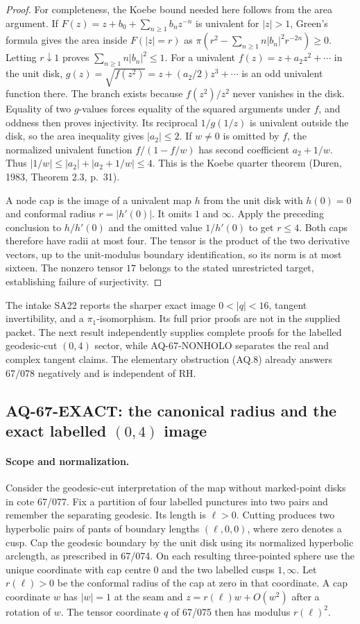 \begin{proof}
For completeness, the Koebe bound needed here follows
from the area argument. If
$F(z)=z+b_0+\sum_{n\geq1}b_nz^{-n}$ is univalent for
$|z|>1$, Green's formula gives the area inside
$F(|z|=r)$ as
$\pi(r^2-\sum_{n\geq1}n|b_n|^2r^{-2n})\geq0$.
Letting $r\downarrow1$ proves
$\sum_{n\geq1}n|b_n|^2\leq1$.
For a univalent $f(z)=z+a_2z^2+\cdots$ in the unit disk,
$g(z)=\sqrt{f(z^2)}=z+(a_2/2)z^3+\cdots$ is an odd
univalent function there. The branch exists because
$f(z^2)/z^2$ never vanishes in the disk. Equality of
two $g$-values forces equality of the squared
arguments under $f$, and oddness then proves
injectivity. Its reciprocal
$1/g(1/z)$ is univalent outside the disk, so the area
inequality gives $|a_2|\leq2$.
If $w\ne0$ is omitted by $f$, the normalized univalent
function $f/(1-f/w)$ has second coefficient $a_2+1/w$.
Thus $|1/w|\leq|a_2|+|a_2+1/w|\leq4$.
This is the Koebe quarter theorem (Duren, 1983,
Theorem 2.3, p.~31).

A node cap is the image of a univalent map $h$ from
the unit disk with $h(0)=0$ and conformal radius
$r=|h'(0)|$. It omits $1$ and $\infty$.
Apply the preceding conclusion to $h/h'(0)$ and
the omitted value $1/h'(0)$ to get $r\leq4$.
Both caps therefore have radii at most four.
The tensor is the product of the two derivative
vectors, up to the unit-modulus boundary identification,
so its norm is at most sixteen. The nonzero tensor
$17$ belongs to the stated unrestricted target,
establishing failure of surjectivity.
\end{proof}
The intake SA22 reports the sharper exact image
$0<|q|<16$, tangent invertibility, and a $\pi_1$-isomorphism.
Its full prior proofs are not in the supplied packet.
The next result independently supplies complete proofs
for the labelled geodesic-cut $(0,4)$ sector, while
AQ-67-NONHOLO separates the real and complex tangent claims.
The elementary obstruction (AQ.8) already answers
67/078 negatively and is independent of RH.

\subsection{AQ-67-EXACT: the canonical radius and the exact labelled $(0,4)$ image}
\paragraph{Scope and normalization.}
Consider the geodesic-cut interpretation of the map without marked-point
disks in cote 67/077. Fix a partition of four labelled punctures into two
pairs and remember the separating geodesic. Its length is $\ell>0$.
Cutting produces two hyperbolic pairs of pants of boundary lengths
$(\ell,0,0)$, where zero denotes a cusp. Cap the geodesic boundary by the
unit disk using its normalized hyperbolic arclength, as prescribed in
67/074. On each resulting three-pointed sphere use the unique coordinate
with cap centre $0$ and the two labelled cusps $1,\infty$.
Let $r(\ell)>0$ be the conformal radius of the cap at zero in that
coordinate. A cap coordinate $w$ has $|w|=1$ at the seam and
$z=r(\ell)w+O(w^2)$ after a rotation of $w$.
The tensor coordinate $q$ of 67/075 then has modulus $r(\ell)^2$.

